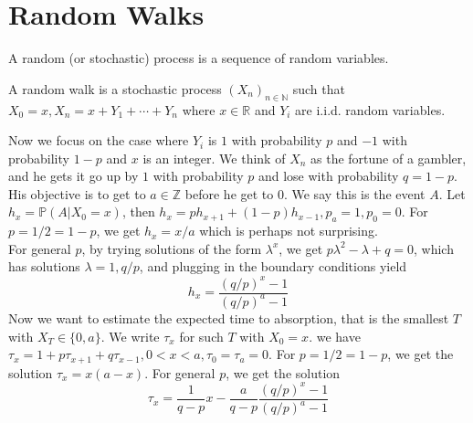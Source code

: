 \section{Random Walks}
\begin{definition}
    A random (or stochastic) process is a sequence of random variables.
\end{definition}
\begin{definition}
    A random walk is a stochastic process $(X_n)_{n\in\mathbb N}$ such that $X_0=x,X_n=x+Y_1+\cdots +Y_n$ where $x\in\mathbb R$ and $Y_i$ are i.i.d. random variables.
\end{definition}
Now we focus on the case where $Y_i$ is $1$ with probability $p$ and $-1$ with probability $1-p$ and $x$ is an integer.
We think of $X_n$ as the fortune of a gambler, and he gets it go up by $1$ with probability $p$ and lose with probability $q=1-p$.
His objective is to get to $a\in\mathbb Z$ before he get to $0$.
We say this is the event $A$.
Let $h_x=\mathbb P(A|X_0=x)$, then $h_x=ph_{x+1}+(1-p)h_{x-1},p_a=1,p_0=0$.
For $p=1/2=1-p$, we get $h_x=x/a$ which is perhaps not surprising.\\
For general $p$, by trying solutions of the form $\lambda^x$, we get $p\lambda^2-\lambda+q=0$, which has solutions $\lambda=1,q/p$, and plugging in the boundary conditions yield
$$h_x=\frac{(q/p)^x-1}{(q/p)^a-1}$$
Now we want to estimate the expected time to absorption, that is the smallest $T$ with $X_T\in\{0,a\}$.
We write $\tau_x$ for such $T$ with $X_0=x$.
we have $\tau_x=1+p\tau_{x+1}+q\tau_{x-1},0<x<a,\tau_0=\tau_a=0$.
For $p=1/2=1-p$, we get the solution $\tau_x=x(a-x)$.
For general $p$, we get the solution
$$\tau_x=\frac{1}{q-p}x-\frac{a}{q-p}\frac{(q/p)^x-1}{(q/p)^a-1}$$